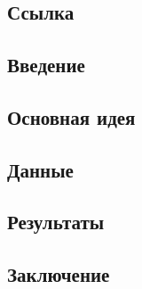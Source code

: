 
\section{}

\subsection*{Ссылка}
\subsection*{Введение}
\subsection*{Основная идея}
\subsection*{Данные}
\subsection*{Результаты}
\subsection*{Заключение}